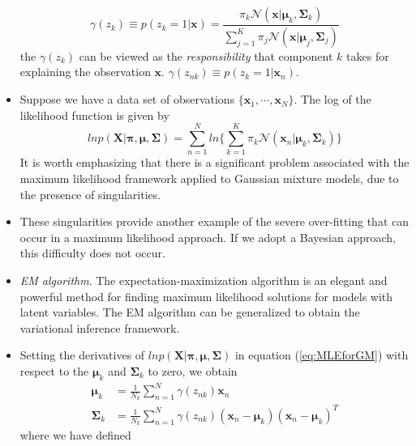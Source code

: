 \documentclass[12pt, a4paper]{article}
\newcommand{\N}{\mathcal{N}}
\begin{document}
\begin{itemize}
        \begin{equation}
            \label{eq:responsibility}
            \gamma(z_k)\equiv p(z_k=1|\bm{x})=\frac{\pi_k\N(\bm{x}|\bm{\mu}_k,
            \mathbf{\Sigma}_k)}{\sum_{j=1}^K\pi_j\N(\bm{x}|\bm{\mu}_j,\mathbf{\Sigma}_j)}
        \end{equation}
        the $\gamma(z_k)$ can be viewed as the \textit{responsibility} that component $k$
        takes for explaining the observation $\bm{x}$. $\gamma(z_{nk})\equiv 
        p(z_k=1|\bm{x}_n)$.
        \item Suppose we have a data set of observations $\{\bm{x}_1,\cdots,\bm{x}_N\}$. 
        The log of the likelihood function is given by
        \begin{equation}
            \label{eq:MLEforGM}
            lnp(\mathbf{X}|\bm{\pi},\bm{\mu},\mathbf{\Sigma})=\sum_{n=1}^Nln
            \Big\{\sum_{k=1}^K\pi_k\N(\bm{x}_n|\bm{\mu}_k,\mathbf{\Sigma}_k)\Big\}
        \end{equation}
        It is worth emphasizing that there is a significant problem associated with the 
        maximum likelihood framework applied to Gaussian mixture models, due to the 
        presence of singularities. 
        \item These singularities provide another example of the severe over-fitting that
        can occur in a maximum likelihood approach. If we adopt a Bayesian approach, this
        difficulty does not occur. 
        \item \textit{EM algorithm}. The expectation-maximization algorithm is an elegant
        and powerful method for finding maximum likelihood solutions for models with 
        latent variables. The EM algorithm can be generalized to obtain the variational
        inference framework. 
        \item Setting the derivatives of $lnp(\mathbf{X}|\bm{\pi},\bm{\mu},
        \mathbf{\Sigma})$ in equation (\ref{eq:MLEforGM}) with respect to the $\bm{\mu}_k$
        and $\mathbf{\Sigma}_k$ to zero, we obtain
        \begin{align}
            \label{eq:mean}
            \bm{\mu}_k&=\frac{1}{N_k}\sum_{n=1}^N\gamma(z_{nk})\bm{x}_n\\
            \label{eq:corvariance}
            \mathbf{\Sigma}_k&=\frac{1}{N_k}\sum_{n=1}^N\gamma(z_{nk})
            (\bm{x}_n-\bm{\mu}_k)(\bm{x}_n-\bm{\mu}_k)^T
        \end{align}
        where we have defined
        \begin{equation}

\end{equation}
\end{itemize}
\end{document}
